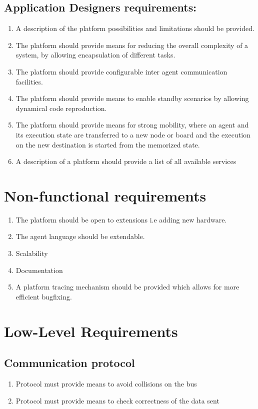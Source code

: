 \documentclass{scrreprt}
\begin{document}
\subsection{Application Designers requirements:}
\renewcommand{\labelenumi}{R_A_DES_\arabic{enumi}}
\begin{enumerate}
\item A description of the platform possibilities and limitations should be provided.
\item The platform should provide means for reducing the overall complexity of a system, by allowing encapsulation of different tasks.
\item The platform should provide configurable inter agent communication facilities.
\item The platform should provide means to enable standby scenarios by allowing dynamical code reproduction.
\item The platform should provide means for strong mobility, where an agent and its execution state are transferred to a new node or board and
   the execution on the new destination is started from the memorized state.
\item A description of a platform should provide a list of all available services
\end{enumerate}

\section{Non-functional requirements}
\renewcommand{\labelenumi}{R_NF_\arabic{enumi}}
\begin{enumerate}
\item The platform should be open to extensions i.e adding new hardware.
\item The agent language should be extendable.
\item Scalability
\item Documentation 
\item A platform tracing mechanism should be provided which allows for more efficient bugfixing.
\end{enumerate}


\section{Low-Level Requirements}


\subsection{Communication protocol}
\renewcommand{\labelenumi}{R_LL_CP_\arabic{enumi}}
\begin{enumerate}
\item Protocol must provide means to avoid collisions on the bus
\item Protocol must provide means to check correctness of the data sent
\end{enumerate}
\end{document}
